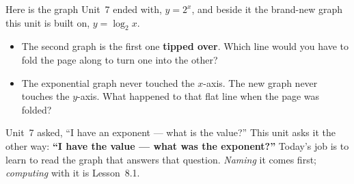 \documentclass[10pt]{article}
\newcommand{\lgrid}[4]{%
  \draw[step=1, linegray!40, very thin] (#1,#3) grid (#2,#4);
  \draw[->, semithick, charcoal] (#1,0)--(#2,0) node[below right, font=\scriptsize]{$x$};
  \draw[->, semithick, charcoal] (0,#3)--(0,#4) node[left, font=\scriptsize]{$y$};}
\newcommand{\logcurve}[5]{\draw[very thick, forest, domain=#4:#5, samples=120, smooth]
  plot ({pow(#1,\x-(#3))+(#2)},{\x});}
\begin{document}
\begin{hookbox}
Here is the graph Unit~7 ended with, $y=2^x$, and beside it the brand-new graph this unit is built
on, $y=\log_2 x$.
\begin{center}
\end{center}
\begin{itemize}\setlength{\itemsep}{1pt}
  \item The second graph is the first one \textbf{tipped over}. Which line would you have to fold the page along to turn one into the other? 
  \item The exponential graph never touched the $x$-axis. The new graph never touches the $y$-axis. What happened to that flat line when the page was folded? 
\end{itemize}
Unit~7 asked, ``I have an exponent --- what is the value?'' This unit asks it the other way:
\textbf{``I have the value --- what was the exponent?''} Today's job is to learn to read the graph
that answers that question. \emph{Naming} it comes first; \emph{computing} with it is Lesson~8.1.
\end{hookbox}
\end{document}
